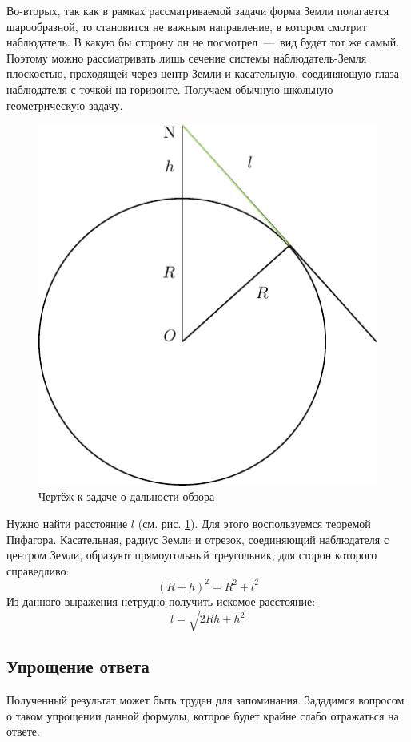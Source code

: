 \documentclass[titlepage]{article}
\begin{document}
\par
Во\--вторых, так как в рамках рассматриваемой задачи форма Земли полагается шарообразной, то становится не важным направление, в котором смотрит наблюдатель. В какую бы сторону он не посмотрел~\----~вид будет тот же самый. Поэтому можно рассматривать лишь сечение системы наблюдатель\--Земля плоскостью, проходящей через центр Земли и касательную, соединяющую глаза наблюдателя с точкой на горизонте. Получаем обычную школьную геометрическую задачу.
\begin{figure}[h]
 \centering
 \includegraphics[scale = 0.8]{first1.pdf}
 \caption{Чертёж к задаче о дальности обзора}
 \label{fig:1}
\end{figure}
\par
Нужно найти расстояние $l$ (см. рис. \ref{fig:1}). Для этого воспользуемся теоремой Пифагора. Касательная, радиус Земли и отрезок, соединяющий наблюдателя с центром Земли, образуют прямоугольный треугольник, для сторон которого справедливо:
\begin{equation}
 (R+h)^2 = R^2 + l^2
\end{equation}
Из данного выражения нетрудно получить искомое расстояние:
\begin{equation}\label{eq:1}
 l = \sqrt{2Rh + h^2}
\end{equation}

\subsection{Упрощение ответа}
Полученный результат может быть труден для запоминания. Зададимся вопросом о таком упрощении данной формулы, которое будет крайне слабо отражаться на ответе.
\end{document}
